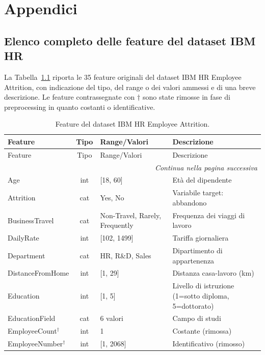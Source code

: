 \chapter{Appendici}

\section{Elenco completo delle feature del dataset IBM HR}
\label{app:features}

La Tabella~\ref{tab:features_complete} riporta le 35 feature originali del dataset IBM HR Employee Attrition, con indicazione del tipo, del range o dei valori ammessi e di una breve descrizione. Le feature contrassegnate con $\dagger$ sono state rimosse in fase di preprocessing in quanto costanti o identificative.

\begin{longtable}{p{4.2cm} c p{3.2cm} p{4.5cm}}
    \caption{Feature del dataset IBM HR Employee Attrition.}
    \label{tab:features_complete} \\
    \toprule
    Feature & Tipo & Range/Valori & Descrizione \\
    \midrule
    \endfirsthead
    \toprule
    Feature & Tipo & Range/Valori & Descrizione \\
    \midrule
    \endhead
    \midrule
    \multicolumn{4}{r}{\textit{Continua nella pagina successiva}} \\
    \bottomrule
    \endfoot
    \bottomrule
    \endlastfoot
    Age & int & [18, 60] & Età del dipendente \\
    Attrition & cat & Yes, No & Variabile target: abbandono \\
    BusinessTravel & cat & Non-Travel, Rarely, Frequently & Frequenza dei viaggi di lavoro \\
    DailyRate & int & [102, 1499] & Tariffa giornaliera \\
    Department & cat & HR, R\&D, Sales & Dipartimento di appartenenza \\
    DistanceFromHome & int & [1, 29] & Distanza casa-lavoro (km) \\
    Education & int & [1, 5] & Livello di istruzione (1=sotto diploma, 5=dottorato) \\
    EducationField & cat & 6 valori & Campo di studi \\
    EmployeeCount$^\dagger$ & int & 1 & Costante (rimossa) \\
    EmployeeNumber$^\dagger$ & int & [1, 2068] & Identificativo (rimosso) \\

\end{longtable}
